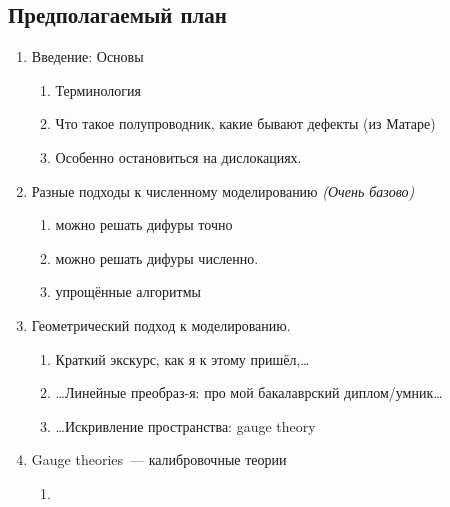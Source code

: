 \documentclass[a4paper, 14pt, titlepage]{extarticle}
\begin{document}

    \clearpage
    \tableofcontents
  \clearpage


  \subsection{Предполагаемый план}

  \begin{enumerate}
    \item Введение: Основы
      \begin{enumerate}
        \item Терминология \label{enu:terms}
        \item Что такое полупроводник, какие бывают дефекты (из Матаре) \label{enu:semicond}
        \item Особенно остановиться на дислокациях.
      \end{enumerate}
    \item Разные подходы к численному моделированию \emph{(Очень базово)}
      \begin{enumerate}
        \item можно решать дифуры точно
        \item можно решать дифуры численно. \label{enu:numeric}
        \item упрощённые алгоритмы          \label{enu:simple}
      \end{enumerate}
    \item Геометрический подход к моделированию.
      \begin{enumerate}
        \item Краткий экскурс, как я к этому пришёл,\dots
        \item \dots Линейные преобраз-я: про мой бакалаврский диплом/умник\dots
        \item \dots Искривление пространства: gauge theory
      \end{enumerate}
    \item Gauge theories~--- калибровочные теории \label{enu:gauge}
      \begin{enumerate}
        \item {}

\end{enumerate}
\end{enumerate}
\end{document}
